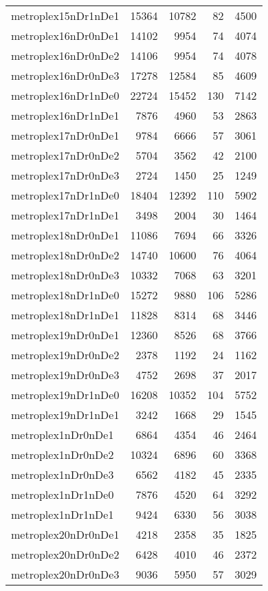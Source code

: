 \begin{tabular}{lrrrr}
metroplex15nDr1nDe1 & 15364 & 10782 & 82 & 4500 \\
metroplex16nDr0nDe1 & 14102 & 9954 & 74 & 4074 \\
metroplex16nDr0nDe2 & 14106 & 9954 & 74 & 4078 \\
metroplex16nDr0nDe3 & 17278 & 12584 & 85 & 4609 \\
metroplex16nDr1nDe0 & 22724 & 15452 & 130 & 7142 \\
metroplex16nDr1nDe1 & 7876 & 4960 & 53 & 2863 \\
metroplex17nDr0nDe1 & 9784 & 6666 & 57 & 3061 \\
metroplex17nDr0nDe2 & 5704 & 3562 & 42 & 2100 \\
metroplex17nDr0nDe3 & 2724 & 1450 & 25 & 1249 \\
metroplex17nDr1nDe0 & 18404 & 12392 & 110 & 5902 \\
metroplex17nDr1nDe1 & 3498 & 2004 & 30 & 1464 \\
metroplex18nDr0nDe1 & 11086 & 7694 & 66 & 3326 \\
metroplex18nDr0nDe2 & 14740 & 10600 & 76 & 4064 \\
metroplex18nDr0nDe3 & 10332 & 7068 & 63 & 3201 \\
metroplex18nDr1nDe0 & 15272 & 9880 & 106 & 5286 \\
metroplex18nDr1nDe1 & 11828 & 8314 & 68 & 3446 \\
metroplex19nDr0nDe1 & 12360 & 8526 & 68 & 3766 \\
metroplex19nDr0nDe2 & 2378 & 1192 & 24 & 1162 \\
metroplex19nDr0nDe3 & 4752 & 2698 & 37 & 2017 \\
metroplex19nDr1nDe0 & 16208 & 10352 & 104 & 5752 \\
metroplex19nDr1nDe1 & 3242 & 1668 & 29 & 1545 \\
metroplex1nDr0nDe1 & 6864 & 4354 & 46 & 2464 \\
metroplex1nDr0nDe2 & 10324 & 6896 & 60 & 3368 \\
metroplex1nDr0nDe3 & 6562 & 4182 & 45 & 2335 \\
metroplex1nDr1nDe0 & 7876 & 4520 & 64 & 3292 \\
metroplex1nDr1nDe1 & 9424 & 6330 & 56 & 3038 \\
metroplex20nDr0nDe1 & 4218 & 2358 & 35 & 1825 \\
metroplex20nDr0nDe2 & 6428 & 4010 & 46 & 2372 \\
metroplex20nDr0nDe3 & 9036 & 5950 & 57 & 3029 \\

\end{tabular}
